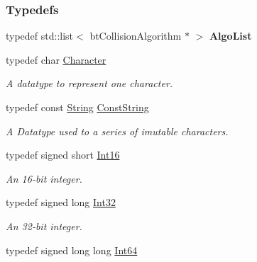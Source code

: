 \subsubsection*{Typedefs}
\begin{DoxyCompactItemize}
\item 
\hypertarget{namespaceMezzanine_af18eb4e539728524f1a64ba1726ad9cc}{
typedef std::list$<$ btCollisionAlgorithm $\ast$ $>$ {\bfseries AlgoList}}
\label{namespaceMezzanine_af18eb4e539728524f1a64ba1726ad9cc}

\item 
typedef char \hyperlink{namespaceMezzanine_ad5147a419db7627ee552a2b582f1052d}{Character}
\begin{DoxyCompactList}\small\item\em A datatype to represent one character. \item\end{DoxyCompactList}\item 
typedef const \hyperlink{namespaceMezzanine_acf9fcc130e6ebf08e3d8491aebcf1c86}{String} \hyperlink{namespaceMezzanine_a63cd699ac54b73953f35ec9cfc05e506}{ConstString}
\begin{DoxyCompactList}\small\item\em A Datatype used to a series of imutable characters. \item\end{DoxyCompactList}\item 
\hypertarget{namespaceMezzanine_adb602bffcbc8f1b381b2f529e9e364f6}{
typedef signed short \hyperlink{namespaceMezzanine_adb602bffcbc8f1b381b2f529e9e364f6}{Int16}}
\label{namespaceMezzanine_adb602bffcbc8f1b381b2f529e9e364f6}

\begin{DoxyCompactList}\small\item\em An 16-\/bit integer. \item\end{DoxyCompactList}\item 
\hypertarget{namespaceMezzanine_a590a2f3eb4a187e1b25209e546e540e1}{
typedef signed long \hyperlink{namespaceMezzanine_a590a2f3eb4a187e1b25209e546e540e1}{Int32}}
\label{namespaceMezzanine_a590a2f3eb4a187e1b25209e546e540e1}

\begin{DoxyCompactList}\small\item\em An 32-\/bit integer. \item\end{DoxyCompactList}\item 
\hypertarget{namespaceMezzanine_ab203dfc8311caab7cc86ee5a0bf962ed}{
typedef signed long long \hyperlink{namespaceMezzanine_ab203dfc8311caab7cc86ee5a0bf962ed}{Int64}}
\label{namespaceMezzanine_ab203dfc8311caab7cc86ee5a0bf962ed}


\end{DoxyCompactItemize}

